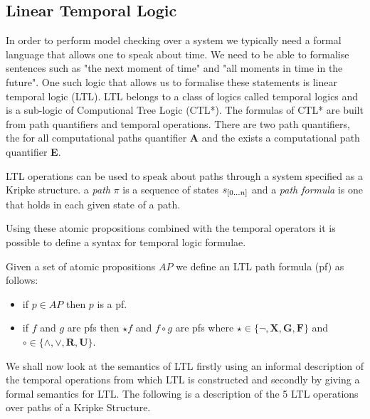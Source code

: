 \subsection*{Linear Temporal Logic}

In order to perform model checking over a system we typically need a formal language that allows one to speak about time. We need to be able to formalise sentences such as "the next moment of time" and "all moments in time in the future". One such logic that allows us to formalise these statements is linear temporal logic (LTL)\cite{AP77}.  LTL belongs to a class of logics called temporal logics and is a sub-logic of Computional Tree Logic (CTL*). The formulas of CTL* are built from path quantifiers and temporal operations. There are two path quantifiers, the for all computational paths quantifier \textbf{A} and the exists a computational path quantifier \textbf{E}. 

LTL operations can be used to speak about paths through a system specified as a Kripke structure.
a \emph{path} $\pi$ is a sequence of states $s_{{[}0 \ldots n {]}}$ and a \emph{path formula} is one that holds in each given state of a path. 

Using these atomic propositions combined with the temporal operators it is possible to define a syntax for temporal logic formulae.

\begin{mydef}
Given a set of atomic propositions $AP$ we define an LTL path formula (pf) as follows:

\begin{itemize}
\item if $p \in AP$ then $p$ is a pf.

\item if $f$ and $g$ are pfs then $\star f$ and $f \circ g$ are pfs where $\star \in \{\neg,\mathbf{X},\mathbf{G}, \mathbf{F}\}$ and $\circ \in \{ \wedge,\vee,\textbf{R},\textbf{U} \}$.
\end{itemize}

\end{mydef}



We shall now look at the semantics of LTL firstly using an informal description of the temporal operations from which LTL is constructed and secondly by giving a formal semantics for LTL. The following is a description of the 5 LTL operations over paths of a Kripke Structure.


